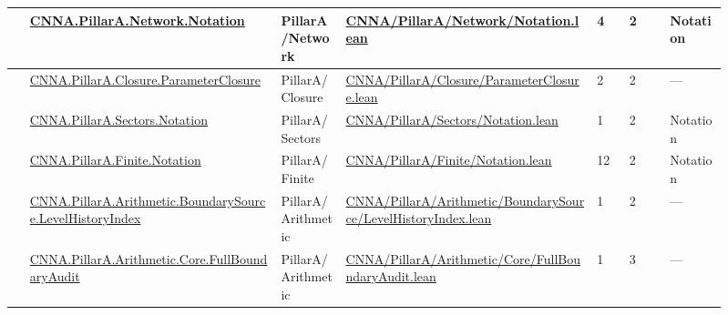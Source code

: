 \begin{longtable}{L{0.025\linewidth} L{0.315\linewidth} L{0.08\linewidth} L{0.315\linewidth} L{0.045\linewidth} L{0.055\linewidth} L{0.07\linewidth}}
\hline
{} & \href{run:repo_snapshot/CNNA/PillarA/Network/Notation.lean}{CNNA.\allowbreak{}PillarA.\allowbreak{}Network.\allowbreak{}Notation} & PillarA/\allowbreak{}Network & \href{run:repo_snapshot/CNNA/PillarA/Network/Notation.lean}{CNNA/\allowbreak{}PillarA/\allowbreak{}Network/\allowbreak{}Notation.\allowbreak{}lean} & 4 & 2 & Notation\\
\hline
{} & \href{run:repo_snapshot/CNNA/PillarA/Closure/ParameterClosure.lean}{CNNA.\allowbreak{}PillarA.\allowbreak{}Closure.\allowbreak{}ParameterClosure} & PillarA/\allowbreak{}Closure & \href{run:repo_snapshot/CNNA/PillarA/Closure/ParameterClosure.lean}{CNNA/\allowbreak{}PillarA/\allowbreak{}Closure/\allowbreak{}ParameterClosure.\allowbreak{}lean} & 2 & 2 & ---\\
\hline
{} & \href{run:repo_snapshot/CNNA/PillarA/Sectors/Notation.lean}{CNNA.\allowbreak{}PillarA.\allowbreak{}Sectors.\allowbreak{}Notation} & PillarA/\allowbreak{}Sectors & \href{run:repo_snapshot/CNNA/PillarA/Sectors/Notation.lean}{CNNA/\allowbreak{}PillarA/\allowbreak{}Sectors/\allowbreak{}Notation.\allowbreak{}lean} & 1 & 2 & Notation\\
\hline
{} & \href{run:repo_snapshot/CNNA/PillarA/Finite/Notation.lean}{CNNA.\allowbreak{}PillarA.\allowbreak{}Finite.\allowbreak{}Notation} & PillarA/\allowbreak{}Finite & \href{run:repo_snapshot/CNNA/PillarA/Finite/Notation.lean}{CNNA/\allowbreak{}PillarA/\allowbreak{}Finite/\allowbreak{}Notation.\allowbreak{}lean} & 12 & 2 & Notation\\
\hline
{} & \href{run:repo_snapshot/CNNA/PillarA/Arithmetic/BoundarySource/LevelHistoryIndex.lean}{CNNA.\allowbreak{}PillarA.\allowbreak{}Arithmetic.\allowbreak{}BoundarySource.\allowbreak{}LevelHistoryIndex} & PillarA/\allowbreak{}Arithmetic & \href{run:repo_snapshot/CNNA/PillarA/Arithmetic/BoundarySource/LevelHistoryIndex.lean}{CNNA/\allowbreak{}PillarA/\allowbreak{}Arithmetic/\allowbreak{}BoundarySource/\allowbreak{}LevelHistoryIndex.\allowbreak{}lean} & 1 & 2 & ---\\
\hline
{} & \href{run:repo_snapshot/CNNA/PillarA/Arithmetic/Core/FullBoundaryAudit.lean}{CNNA.\allowbreak{}PillarA.\allowbreak{}Arithmetic.\allowbreak{}Core.\allowbreak{}FullBoundaryAudit} & PillarA/\allowbreak{}Arithmetic & \href{run:repo_snapshot/CNNA/PillarA/Arithmetic/Core/FullBoundaryAudit.lean}{CNNA/\allowbreak{}PillarA/\allowbreak{}Arithmetic/\allowbreak{}Core/\allowbreak{}FullBoundaryAudit.\allowbreak{}lean} & 1 & 3 & ---\\

\end{longtable}
